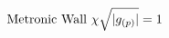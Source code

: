 \documentclass[preview]{standalone}
\begin{document}
\begin{align*}
\special{dvisvgm:raw <g id='unique000'>}\text{Metronic Wall }\chi\sqrt{|g_{(p)}|}=1\special{dvisvgm:raw </g>}
\end{align*}
\end{document}
